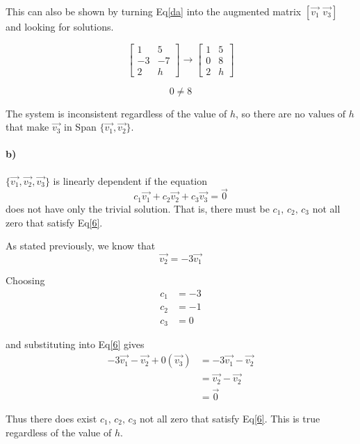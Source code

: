 \documentclass[12pt, oneside]{article}   	%
\begin{document}
This can also be shown by turning Eq\eqref{da} into the augmented matrix $[\vec{v_1}  \,\,\vec{v_3}]$ and looking for solutions.

\[  \left[ \begin{array}{rr}
1&5\\
-3&-7\\
2&h\end{array}\right ]\rightarrow
\left[ \begin{array}{rr}
1&5\\
0&8\\
2&h\end{array}\right ]\]

\begin{equation}
0\neq8
\end{equation}

The system is inconsistent regardless of the value of $h$, so there are $\boxed{\textrm{no values of } h}$ that make $\vec{v_3}$ in Span $\{\vec{v_1},\vec{v_2}\}$.

\paragraph{b)} $\{\vec{v_1},\vec{v_2},\vec{v_3}\}$ is linearly dependent if the equation
\begin{equation}\label{6}
c_1\vec{v_1}+c_2\vec{v_2}+c_3\vec{v_3}=\vec{0}
\end{equation}
 does not have only the trivial solution. That is, there must be $c_1, \,c_2,\,c_3$ not all zero that satisfy Eq\eqref{6}. 

As stated previously, we know that  
\begin{equation}
\vec{v_2}=-3\vec{v_1}
\end{equation}

Choosing 
\begin{align}
c_1&=-3\\
c_2&=-1\\
c_3&=0
\end{align}

and substituting into Eq\eqref{6} gives
\begin{equation}
\begin{split}
-3\vec{v_1}-\vec{v_2}+0(\vec{v_3})&=-3\vec{v_1}-\vec{v_2}\\
&=\vec{v_2}-\vec{v_2}\\
&=\vec{0}
\end{split}
\end{equation}

Thus there does exist $c_1, \,c_2,\,c_3$ not all zero that satisfy Eq\eqref{6}. This is true regardless of the value of $h$.
\end{document}

